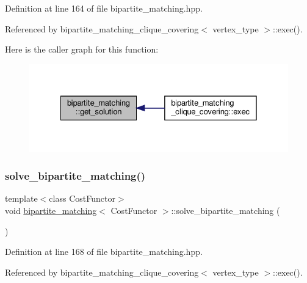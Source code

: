 Definition at line 164 of file bipartite\+\_\+matching.\+hpp.



Referenced by bipartite\+\_\+matching\+\_\+clique\+\_\+covering$<$ vertex\+\_\+type $>$\+::exec().

Here is the caller graph for this function\+:
\nopagebreak
\begin{figure}[H]
\begin{center}
\leavevmode
\includegraphics[width=328pt]{dc/df0/classbipartite__matching_a51acadff82a7c5fc203dc401c4652223_icgraph}
\end{center}
\end{figure}
\mbox{\label{classbipartite__matching_adaa99c992790423e6ecc95f8ac8bafe6}} 
\subsubsection{\texorpdfstring{solve\+\_\+bipartite\+\_\+matching()}{solve\_bipartite\_matching()}}
{\footnotesize\ttfamily template$<$class Cost\+Functor$>$ \\
void \hyperlink{classbipartite__matching}{bipartite\+\_\+matching}$<$ Cost\+Functor $>$\+::solve\+\_\+bipartite\+\_\+matching (\begin{DoxyParamCaption}{ }\end{DoxyParamCaption})\hspace{0.3cm}{\ttfamily [inline]}}



Definition at line 168 of file bipartite\+\_\+matching.\+hpp.



Referenced by bipartite\+\_\+matching\+\_\+clique\+\_\+covering$<$ vertex\+\_\+type $>$\+::exec().

